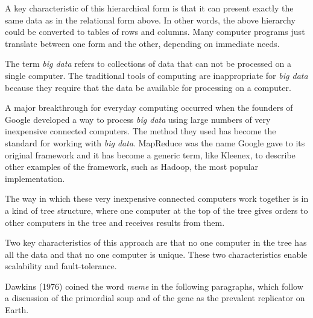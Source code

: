 A key characteristic of this hierarchical form is that it can present
exactly the same data as in the relational form above. In other words,
the above hierarchy could be converted to tables of rows and columns.
Many computer programs just translate between one form and the other,
depending on immediate needs.

\hypertarget{big-data}{%
\label{big-data}}

The term \emph{big data} refers to collections of data that can not be
processed on a single computer. The traditional tools of computing are
inappropriate for \emph{big data} because they require that the data be
available for processing on a computer.

A major breakthrough for everyday computing occurred when the founders
of Google developed a way to process \emph{big data} using large numbers
of very inexpensive connected computers. The method they used has become
the standard for working with \emph{big data}. MapReduce was the name
Google gave to its original framework and it has become a generic term,
like Kleenex, to describe other examples of the framework, such as
Hadoop, the most popular implementation.

The way in which these very inexpensive connected computers work
together is in a kind of tree structure, where one computer at the top
of the tree gives orders to other computers in the tree and receives
results from them.

Two key characteristics of this approach are that no one computer in the
tree has all the data and that no one computer is unique. These two
characteristics enable scalability and fault-tolerance.

\hypertarget{memes}{%
\label{memes}}

Dawkins (1976) coined the word \emph{meme} in the following paragraphs,
which follow a discussion of the primordial soup and of the gene as the
prevalent replicator on Earth.

